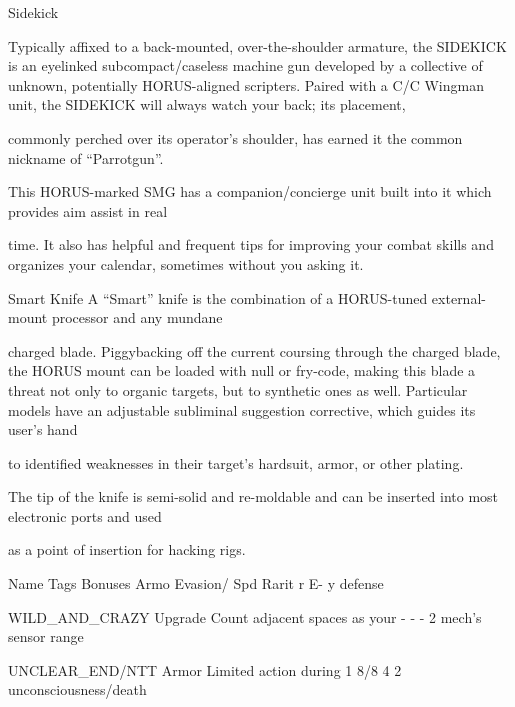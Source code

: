 Sidekick  

Typically affixed to a back-mounted, over-the-shoulder armature, the SIDEKICK is an eyelinked  
subcompact/caseless machine gun developed by a collective of unknown, potentially HORUS-aligned  
scripters. Paired with a C/C Wingman unit, the SIDEKICK will always watch your back; its placement,  

commonly perched over its operator’s shoulder, has earned it the common nickname of “Parrotgun”.  

This HORUS-marked SMG has a companion/concierge unit built into it which provides aim assist in real  

time. It also has helpful and frequent tips for improving your combat skills and organizes your calendar,  
sometimes without you asking it.
 

Smart Knife  
A “Smart” knife is the combination of a HORUS-tuned external-mount processor and any mundane  

charged blade. Piggybacking off the current coursing through the charged blade, the HORUS mount can  
be loaded with null or fry-code, making this blade a threat not only to organic targets, but to synthetic ones  
as well. Particular models have an adjustable subliminal suggestion corrective, which guides its user’s hand  

to identified weaknesses in their target’s hardsuit, armor, or other plating.   

The tip of the knife is semi-solid and re-moldable and can be inserted into most electronic ports and used  

as a point of insertion for hacking rigs.
 

  Name                     Tags        Bonuses                                 Armo     Evasion/     Spd    Rarit 
                                                                                r       E-                 y 
                                                                                        defense 

  WILD\_AND\_CRAZY           Upgrade     Count adjacent spaces as your            -       -            -      2 
                                       mech’s sensor range 

 UNCLEAR\_END/NTT          Armor        Limited action during                    1       8/8          4      2 
                                       unconsciousness/death 

                                                                                                                


